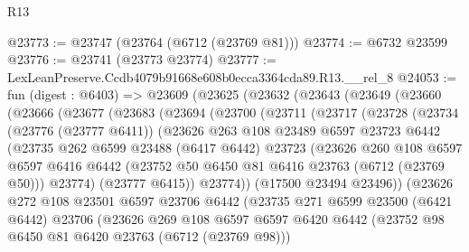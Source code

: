 \begin{lexlean}{R13}
\begin{coremodule}
@23773 := @23747 (@23764 (@6712 (@23769 @81)))
@23774 := @6732 @23599
@23776 := @23741 (@23773 @23774)
@23777 := LexLeanPreserve.Ccdb4079b91668e608b0ecca3364cda89.R13.__rel_8
@24053 := fun (digest : @6403) =>
  @23609
    (@23625
      (@23632
        (@23643
          (@23649
            (@23660
              (@23666
                (@23677
                  (@23683
                    (@23694
                      (@23700
                        (@23711
                          (@23717
                            (@23728
                              (@23734
                                (@23776 (@23777 @6411))
                                (@23626
                                  @263
                                  @108
                                  @23489
                                  @6597
                                  @23723
                                  @6442
                                  (@23735
                                    @262
                                    @6599
                                    @23488
                                    (@6417 @6442)
                                    @23723
                                    (@23626
                                      @260
                                      @108
                                      @6597
                                      @6597
                                      @6416
                                      @6442
                                      (@23752 @50 @6450 @81 @6416 @23763 (@6712 (@23769 @50)))
                                      @23774)
                                    (@23777 @6415))
                                  @23774))
                              (@17500 @23494 @23496))
                            (@23626
                              @272
                              @108
                              @23501
                              @6597
                              @23706
                              @6442
                              (@23735
                                @271
                                @6599
                                @23500
                                (@6421 @6442)
                                @23706
                                (@23626
                                  @269
                                  @108
                                  @6597
                                  @6597
                                  @6420
                                  @6442
                                  (@23752 @98 @6450 @81 @6420 @23763 (@6712 (@23769 @98)))

\end{coremodule}
\end{lexlean}
